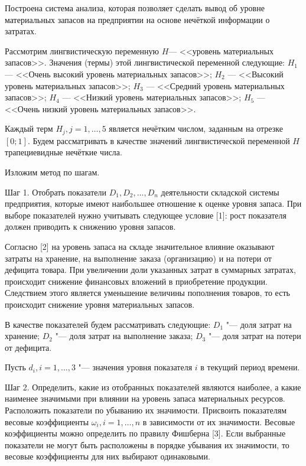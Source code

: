 
\vzmscaption

Построена система анализа, которая позволяет сделать вывод об уровне материальных запасов на предприятии на основе нечёткой информации о затратах.

Рассмотрим лингвистическую переменную $H$--- <<уровень материальных запасов>>. Значения (термы) этой лингвистической переменной следующие:
$H_{1}$ --- <<Очень высокий уровень материальных запасов>>;
$H_{2}$ --- <<Высокий уровень материальных запасов>>;
$H_{3}$ --- <<Средний уровень материальных запасов>>;
$H_{4}$ --- <<Низкий уровень материальных запасов>>;
$H_{5}$ --- <<Очень низкий уровень материальных запасов>>.


Каждый терм $H_{j}, j = 1, \ldots, 5$ является нечётким числом, заданным на отрезке $[0; 1]$. Будем рассматривать в качестве значений лингвистической переменной $H$ трапециевидные нечёткие числа.

Изложим метод по шагам.

Шаг 1. Отобрать показатели $D_{1}, D_{2}, \ldots, D_{n}$ деятельности складской системы предприятия, которые имеют наибольшее отношение к оценке уровня запаса. При выборе показателей нужно учитывать следующее условие [1]: рост показателя должен приводить к снижению уровня запасов.

Согласно [2] на уровень запаса на складе значительное влияние оказывают затраты на хранение, на выполнение заказа (организацию) и на потери от дефицита товара. При увеличении доли указанных затрат в суммарных затратах, происходит снижение финансовых вложений в приобретение продукции. Следствием этого является уменьшение величины пополнения товаров, то есть происходит снижение уровня материальных запасов.

В качестве показателей будем рассматривать следующие:
$D_{1}$ "--- доля затрат на хранение;
$D_{2}$ "--- доля затрат на выполнение заказа;
$D_{3}$ "--- доля затрат на потери от дефицита.

Пусть $d_{i}, i = 1, \ldots, 3$ "--- значения уровня показателя $i$ в текущий период времени.

Шаг 2.
Определить, какие из отобранных показателей являются наиболее, а какие наименее значимыми при влиянии на уровень запаса материальных ресурсов. Расположить показатели по убыванию их значимости.
Присвоить показателям весовые коэффициенты $\omega_{i}, i = 1, \ldots, n$ в зависимости от их значимости.
Весовые коэффициенты можно определить по правилу Фишберна [3].
Если выбранные показатели не могут быть расположены в порядке убывания их значимости, то весовые коэффициенты для них выбирают одинаковыми.

